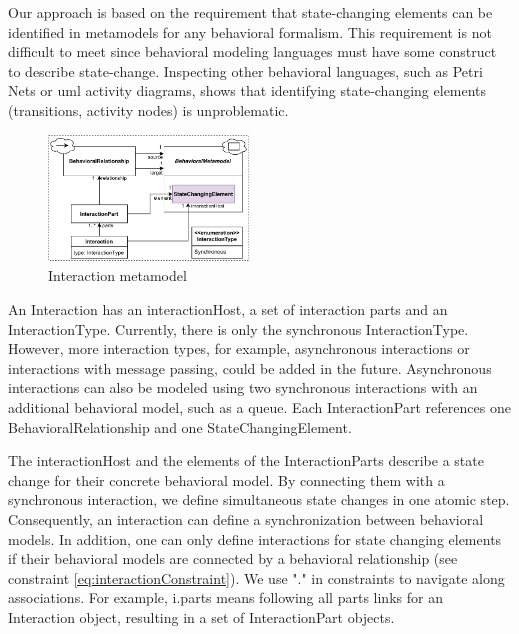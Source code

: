 \documentclass{jot}
\begin{document}
Our approach is based on the requirement that state-changing elements can be identified in metamodels for any behavioral formalism.
This requirement is not difficult to meet since behavioral modeling languages must have some construct to describe state-change.
Inspecting other behavioral languages, such as Petri Nets or \gls*{uml} activity diagrams, shows that identifying state-changing elements (transitions, activity nodes) is unproblematic. 

\begin{figure}[h]
    \centering
    \includegraphics[width=0.475\textwidth]{figures/interaction_metamodel.pdf}
    \caption{Interaction metamodel}
    \label{fig:interaction_metamodel}
\end{figure}

An \textsf{Interaction} has an \textsf{interactionHost}, a set of interaction \textsf{parts} and an \textsf{InteractionType}.
Currently, there is only the \textsf{synchronous} \textsf{InteractionType}.
However, more interaction types, for example, asynchronous interactions or interactions with message passing, could be added in the future.
Asynchronous interactions can also be modeled using two synchronous interactions with an additional behavioral model, such as a queue.
Each \textsf{InteractionPart} references one \textsf{BehavioralRelationship} and one \textsf{StateChangingElement}.

The \textsf{interactionHost} and the elements of the \textsf{InteractionPart}s describe a state change for their concrete behavioral model.
By connecting them with a synchronous interaction, we define simultaneous state changes in one atomic step. 
Consequently, an interaction can define a synchronization between behavioral models.
In addition, one can only define interactions for state changing elements if their behavioral models are connected by a behavioral relationship (see constraint \eqref{eq:interactionConstraint}).
We use "." in constraints to navigate along associations.
For example, \textsf{i.parts} means following all \textsf{parts} links for an \textsf{Interaction} object, resulting in a set of \textsf{InteractionPart} objects.
\end{document}

